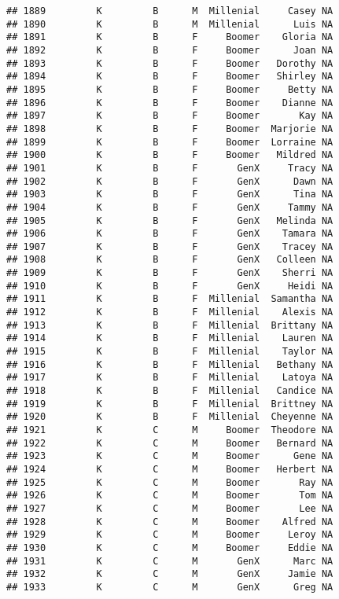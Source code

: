 \documentclass[
]{article}
\begin{document}
\begin{verbatim}
## 1889         K         B      M  Millenial     Casey NA
## 1890         K         B      M  Millenial      Luis NA
## 1891         K         B      F     Boomer    Gloria NA
## 1892         K         B      F     Boomer      Joan NA
## 1893         K         B      F     Boomer   Dorothy NA
## 1894         K         B      F     Boomer   Shirley NA
## 1895         K         B      F     Boomer     Betty NA
## 1896         K         B      F     Boomer    Dianne NA
## 1897         K         B      F     Boomer       Kay NA
## 1898         K         B      F     Boomer  Marjorie NA
## 1899         K         B      F     Boomer  Lorraine NA
## 1900         K         B      F     Boomer   Mildred NA
## 1901         K         B      F       GenX     Tracy NA
## 1902         K         B      F       GenX      Dawn NA
## 1903         K         B      F       GenX      Tina NA
## 1904         K         B      F       GenX     Tammy NA
## 1905         K         B      F       GenX   Melinda NA
## 1906         K         B      F       GenX    Tamara NA
## 1907         K         B      F       GenX    Tracey NA
## 1908         K         B      F       GenX   Colleen NA
## 1909         K         B      F       GenX    Sherri NA
## 1910         K         B      F       GenX     Heidi NA
## 1911         K         B      F  Millenial  Samantha NA
## 1912         K         B      F  Millenial    Alexis NA
## 1913         K         B      F  Millenial  Brittany NA
## 1914         K         B      F  Millenial    Lauren NA
## 1915         K         B      F  Millenial    Taylor NA
## 1916         K         B      F  Millenial   Bethany NA
## 1917         K         B      F  Millenial    Latoya NA
## 1918         K         B      F  Millenial   Candice NA
## 1919         K         B      F  Millenial  Brittney NA
## 1920         K         B      F  Millenial  Cheyenne NA
## 1921         K         C      M     Boomer  Theodore NA
## 1922         K         C      M     Boomer   Bernard NA
## 1923         K         C      M     Boomer      Gene NA
## 1924         K         C      M     Boomer   Herbert NA
## 1925         K         C      M     Boomer       Ray NA
## 1926         K         C      M     Boomer       Tom NA
## 1927         K         C      M     Boomer       Lee NA
## 1928         K         C      M     Boomer    Alfred NA
## 1929         K         C      M     Boomer     Leroy NA
## 1930         K         C      M     Boomer     Eddie NA
## 1931         K         C      M       GenX      Marc NA
## 1932         K         C      M       GenX     Jamie NA
## 1933         K         C      M       GenX      Greg NA

\end{verbatim}
\end{document}
